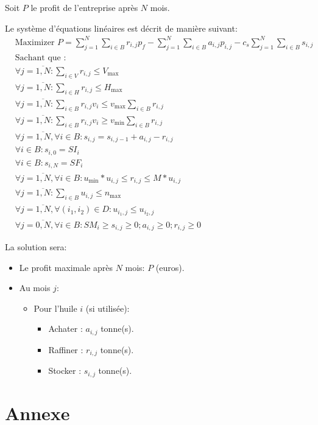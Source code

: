 \documentclass[10pt,a4paper]{article}
\begin{document}
Soit $P$ le profit de l'entreprise après $N$ mois.

Le système d'équations linéaires est décrit de manière suivant:
\begin{align*}
    & \text{Maximizer } P = \sum\limits_{j = 1}^N {\sum\limits_{i \in B}^{} {{r_{i,j}}p_f} }  - \sum\limits_{j = 1}^N {\sum\limits_{i \in B}^{} {{a_{i,j}}{p_{i,j}}} }  - {c_s}\sum\limits_{j = 1}^N {\sum\limits_{i \in B}^{} {{s_{i,j}}} }\\
    & \text{Sachant que : }\\
    & \forall j = \overline {1,N} :\sum\limits_{i \in V}^{} {{r_{i,j}}}  \le {V_{\max }}\\
    & \forall j = \overline {1,N} :\sum\limits_{i \in H}^{} {{r_{i,j}}}  \le {H_{\max }}\\
    & \forall j = \overline {1,N} :\sum\limits_{i \in B}^{} {{r_{i,j}}{v_i}}  \le {v_{\max }}\sum\limits_{i \in B}^{} {{r_{i,j}}} \\
    & \forall j = \overline {1,N} :\sum\limits_{i \in B}^{} {{r_{i,j}}{v_i}}  \ge {v_{\min }}\sum\limits_{i \in B}^{} {{r_{i,j}}} \\
    & \forall j = \overline {1,N} ,\forall i \in B:{s_{i,j}} = {s_{i,j - 1}} + {a_{i,j}} - {r_{i,j}}\\
    & \forall i \in B:{s_{i,0}} = {SI_i}\\
    & \forall i \in B:{s_{i,N}} = {SF_i}\\
    & \forall j = \overline {1,N} ,\forall i \in B:{u_{\min }}*{u_{i,j}} \le {r_{i,j}} \le M*{u_{i,j}}\\
    & \forall j = \overline {1,N} :\sum\limits_{i \in B}^{} {{u_{i,j}}}  \le {n_{\max }}\\
    & \forall j = \overline {1,N} ,\forall \left( {{i_1},{i_2}} \right) \in D:{u_{{i_1},j}} \le {u_{{i_2},j}}\\
    & \forall j = \overline {0,N} ,\forall i \in B:S{M_i} \ge {s_{i,j}} \ge 0;{a_{i,j}} \ge 0;{r_{i,j}} \ge 0
\end{align*}

La solution sera:
\begin{itemize}
    \item Le profit maximale après $N$ mois: $P$ (euros).
    \item Au mois $j$:
    \begin{itemize}
        \item Pour l'huile $i$ (si utilisée):
        \begin{itemize}
            \item Achater : $a_{i,j}$ tonne(s).
            \item Raffiner : $r_{i,j}$ tonne(s).
            \item Stocker : $s_{i,j}$ tonne(s).
        \end{itemize}
    \end{itemize}
\end{itemize}

\section{Annexe}
\end{document}
